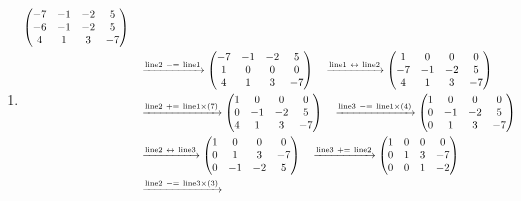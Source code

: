 \documentclass{ltjsarticle}
\begin{document}
\begin{enumerate}
 \item 
\begin{align*}
\begin{pmatrix}
 - 7 & -1 & - 2 & 5\\
 - 6 & -1 & - 2 & 5\\
 4 & 1 & 3 & - 7
\end{pmatrix}\allowdisplaybreaks\\
&\ \ \ \xrightarrow{ \text{line} 2 \ -=\  \text{line} 1 } %
\begin{pmatrix}
 - 7 & -1 & - 2 & 5\\
 1 & 0 & 0 & 0\\
 4 & 1 & 3 & - 7
\end{pmatrix}\ \ \ \xrightarrow{ \text{line} 1 \ \leftrightarrow\  \text{line} 2 } %
\begin{pmatrix}
 1 & 0 & 0 & 0\\
 - 7 & -1 & - 2 & 5\\
 4 & 1 & 3 & - 7
\end{pmatrix}\allowdisplaybreaks\\
&\ \ \ \xrightarrow{ \text{line} 2 \ +=\  \text{line} 1 \times\left( 7 \right)} %
\begin{pmatrix}
 1 & 0 & 0 & 0\\
 0 & -1 & - 2 & 5\\
 4 & 1 & 3 & - 7
\end{pmatrix}
\ \ \ \xrightarrow{ \text{line} 3 \ -=\  \text{line} 1 \times\left( 4 \right)} %
\begin{pmatrix}
 1 & 0 & 0 & 0\\
 0 & -1 & - 2 & 5\\
 0 & 1 & 3 & - 7
\end{pmatrix}\allowdisplaybreaks\\
&\ \ \ \xrightarrow{ \text{line} 2 \ \leftrightarrow\  \text{line} 3 } %
\begin{pmatrix}
 1 & 0 & 0 & 0\\
 0 & 1 & 3 & - 7\\
 0 & -1 & - 2 & 5
\end{pmatrix}\ \ \ \xrightarrow{ \text{line} 3 \ +=\  \text{line} 2 } %
\begin{pmatrix}
 1 & 0 & 0 & 0\\
 0 & 1 & 3 & - 7\\
 0 & 0 & 1 & - 2
\end{pmatrix}\allowdisplaybreaks\\
&\ \ \ \xrightarrow{ \text{line} 2 \ -=\  \text{line} 3 \times\left( 3 \right)} %

\end{align*}
\end{enumerate}
\end{document}

